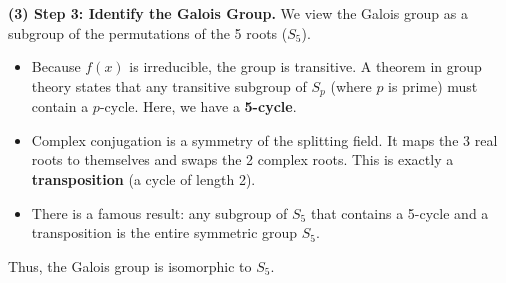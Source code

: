 \begin{solution}
\textbf{(3) Step 3: Identify the Galois Group.}
We view the Galois group as a subgroup of the permutations of the 5 roots ($S_5$).
\begin{itemize}
    \item Because $f(x)$ is irreducible, the group is transitive. A theorem in group theory states that any transitive subgroup of $S_p$ (where $p$ is prime) must contain a $p$-cycle. Here, we have a \textbf{5-cycle}.
    \item Complex conjugation is a symmetry of the splitting field. It maps the 3 real roots to themselves and swaps the 2 complex roots. This is exactly a \textbf{transposition} (a cycle of length 2).
    \item There is a famous result: any subgroup of $S_5$ that contains a 5-cycle and a transposition is the entire symmetric group $S_5$.
\end{itemize}
Thus, the Galois group is isomorphic to \textbf{$S_5$}.
\end{solution}
